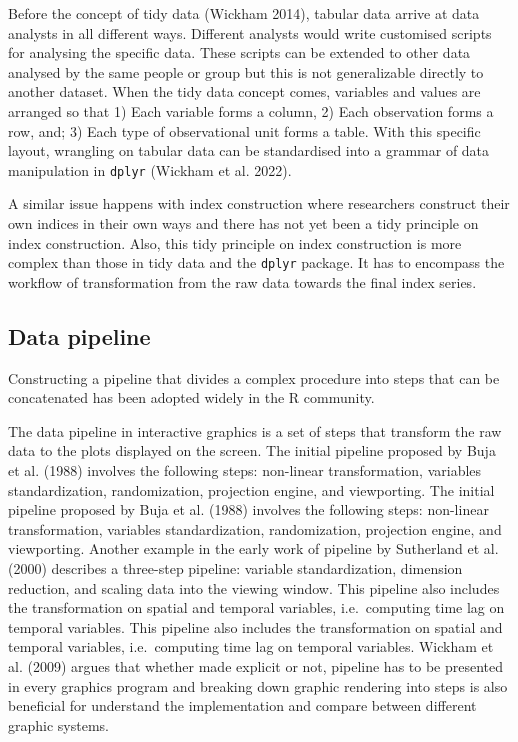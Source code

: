\documentclass[
]{article}
\begin{document}
Before the concept of tidy data (Wickham 2014), tabular data arrive at
data analysts in all different ways. Different analysts would write
customised scripts for analysing the specific data. These scripts can be
extended to other data analysed by the same people or group but this is
not generalizable directly to another dataset. When the tidy data
concept comes, variables and values are arranged so that 1) Each
variable forms a column, 2) Each observation forms a row, and; 3) Each
type of observational unit forms a table. With this specific layout,
wrangling on tabular data can be standardised into a grammar of data
manipulation in \texttt{dplyr} (Wickham et al. 2022).

A similar issue happens with index construction where researchers
construct their own indices in their own ways and there has not yet been
a tidy principle on index construction. Also, this tidy principle on
index construction is more complex than those in tidy data and the
\texttt{dplyr} package. It has to encompass the workflow of
transformation from the raw data towards the final index series.

\hypertarget{data-pipeline}{%
\subsection{Data pipeline}\label{data-pipeline}}

Constructing a pipeline that divides a complex procedure into steps that
can be concatenated has been adopted widely in the R community.

The data pipeline in interactive graphics is a set of steps that
transform the raw data to the plots displayed on the screen. The initial
pipeline proposed by Buja et al. (1988) involves the following steps:
non-linear transformation, variables standardization, randomization,
projection engine, and viewporting. The initial pipeline proposed by
Buja et al. (1988) involves the following steps: non-linear
transformation, variables standardization, randomization, projection
engine, and viewporting. Another example in the early work of pipeline
by Sutherland et al. (2000) describes a three-step pipeline: variable
standardization, dimension reduction, and scaling data into the viewing
window. This pipeline also includes the transformation on spatial and
temporal variables, i.e.~computing time lag on temporal variables. This
pipeline also includes the transformation on spatial and temporal
variables, i.e.~computing time lag on temporal variables. Wickham et al.
(2009) argues that whether made explicit or not, pipeline has to be
presented in every graphics program and breaking down graphic rendering
into steps is also beneficial for understand the implementation and
compare between different graphic systems.
\end{document}
